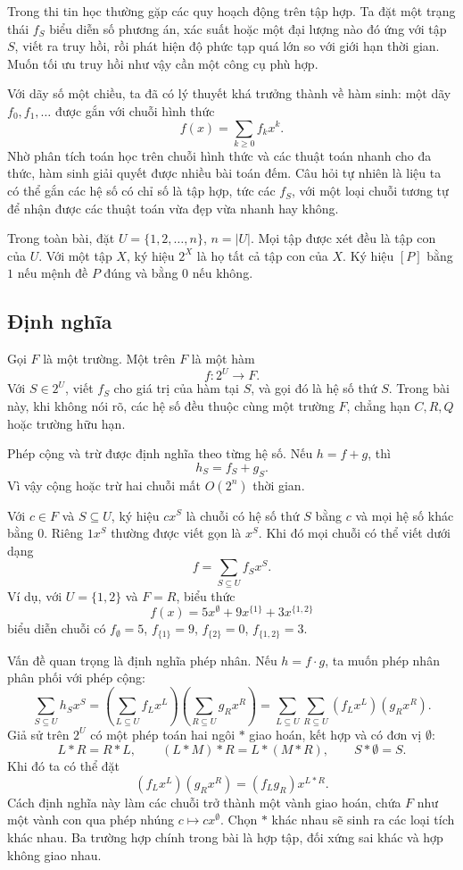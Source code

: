 \documentclass[11pt]{article}
\begin{document}
Trong thi tin học thường gặp các quy hoạch động trên tập hợp. Ta đặt một trạng
thái \(f_S\) biểu diễn số phương án, xác suất hoặc một đại lượng nào đó ứng với
tập \(S\), viết ra truy hồi, rồi phát hiện độ phức tạp quá lớn so với giới hạn
thời gian. Muốn tối ưu truy hồi như vậy cần một công cụ phù hợp.

Với dãy số một chiều, ta đã có lý thuyết khá trưởng thành về hàm sinh: một dãy
\(f_0,f_1,\ldots\) được gắn với chuỗi hình thức
\[
  f(x)=\sum_{k\ge 0} f_k x^k.
\]
Nhờ phân tích toán học trên chuỗi hình thức và các thuật toán nhanh cho đa
thức, hàm sinh giải quyết được nhiều bài toán đếm. Câu hỏi tự nhiên là liệu ta
có thể gắn các hệ số có chỉ số là tập hợp, tức các \(f_S\), với một loại chuỗi
tương tự để nhận được các thuật toán vừa đẹp vừa nhanh hay không.

Trong toàn bài, đặt \(U=\{1,2,\ldots,n\}\), \(n=|U|\). Mọi tập được xét đều là
tập con của \(U\). Với một tập \(X\), ký hiệu \(2^X\) là họ tất cả tập con của
\(X\). Ký hiệu \([P]\) bằng \(1\) nếu mệnh đề \(P\) đúng và bằng \(0\) nếu
không.

\subsection{Định nghĩa}

Gọi \(F\) là một trường. Một  trên \(F\) là
một hàm
\[
  f:2^U\to F.
\]
Với \(S\in 2^U\), viết \(f_S\) cho giá trị của hàm tại \(S\), và gọi đó là hệ
số thứ \(S\). Trong bài này, khi không nói rõ, các hệ số đều thuộc cùng một
trường \(F\), chẳng hạn \(C,R,Q\) hoặc trường hữu hạn.

Phép cộng và trừ được định nghĩa theo từng hệ số. Nếu \(h=f+g\), thì
\[
  h_S=f_S+g_S. \tag{1}
\]
Vì vậy cộng hoặc trừ hai chuỗi mất \(O(2^n)\) thời gian.

Với \(c\in F\) và \(S\subseteq U\), ký hiệu \(c x^S\) là chuỗi có hệ số thứ
\(S\) bằng \(c\) và mọi hệ số khác bằng \(0\). Riêng \(1x^S\) thường được viết
gọn là \(x^S\). Khi đó mọi chuỗi có thể viết dưới dạng
\[
  f=\sum_{S\subseteq U} f_S x^S. \tag{2}
\]
Ví dụ, với \(U=\{1,2\}\) và \(F=R\), biểu thức
\[
  f(x)=5x^\emptyset+9x^{\{1\}}+3x^{\{1,2\}}
\]
biểu diễn chuỗi có \(f_\emptyset=5\), \(f_{\{1\}}=9\),
\(f_{\{2\}}=0\), \(f_{\{1,2\}}=3\).

Vấn đề quan trọng là định nghĩa phép nhân. Nếu \(h=f\cdot g\), ta muốn phép
nhân phân phối với phép cộng:
\[
  \sum_{S\subseteq U} h_Sx^S
  =
  \left(\sum_{L\subseteq U} f_Lx^L\right)
  \left(\sum_{R\subseteq U} g_Rx^R\right)
  =
  \sum_{L\subseteq U}\sum_{R\subseteq U}(f_Lx^L)(g_Rx^R). \tag{3}
\]
Giả sử trên \(2^U\) có một phép toán hai ngôi \(*\) giao hoán, kết hợp và có
đơn vị \(\emptyset\):
\[
  L*R=R*L,\qquad (L*M)*R=L*(M*R),\qquad S*\emptyset=S.
\]
Khi đó ta có thể đặt
\[
  (f_Lx^L)(g_Rx^R)=(f_Lg_R)x^{L*R}.
\]
Cách định nghĩa này làm các chuỗi trở thành một vành giao hoán, chứa \(F\) như
một vành con qua phép nhúng \(c\mapsto c x^\emptyset\). Chọn \(*\) khác nhau
sẽ sinh ra các loại tích khác nhau. Ba trường hợp chính trong bài là hợp tập,
đối xứng sai khác và hợp không giao nhau.
\end{document}
